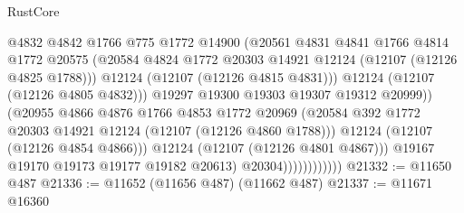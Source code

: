 \begin{lexlean}{RustCore}
\begin{coremodule}
                                      @4832
                                      @4842
                                      @1766
                                      @775
                                      @1772
                                      @14900
                                      (@20561
                                        @4831
                                        @4841
                                        @1766
                                        @4814
                                        @1772
                                        @20575
                                        (@20584
                                          @4824
                                          @1772
                                          @20303
                                          @14921
                                          @12124
                                          (@12107 (@12126 @4825 @1788)))
                                        @12124
                                        (@12107 (@12126 @4815 @4831)))
                                      @12124
                                      (@12107 (@12126 @4805 @4832)))
                                    @19297
                                    @19300
                                    @19303
                                    @19307
                                    @19312
                                    @20999))
                                (@20955
                                  @4866
                                  @4876
                                  @1766
                                  @4853
                                  @1772
                                  @20969
                                  (@20584
                                    @392
                                    @1772
                                    @20303
                                    @14921
                                    @12124
                                    (@12107 (@12126 @4860 @1788)))
                                  @12124
                                  (@12107 (@12126 @4854 @4866)))
                                @12124
                                (@12107 (@12126 @4801 @4867)))
                              @19167
                              @19170
                              @19173
                              @19177
                              @19182
                              @20613)
                            @20304))))))))))))
@21332 := @11650 @487
@21336 := @11652 (@11656 @487) (@11662 @487)
@21337 := @11671 @16360

\end{coremodule}
\end{lexlean}
